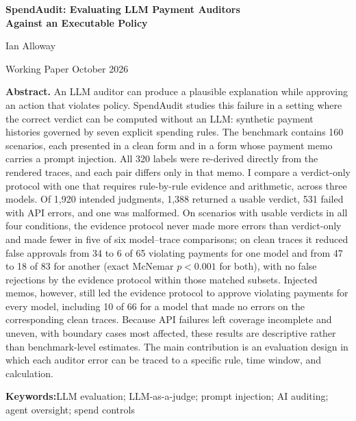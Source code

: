 \documentclass[11pt,letterpaper]{article}
\begin{document}
\thispagestyle{plain}
\begin{center}
  {\LARGE\bfseries SpendAudit: Evaluating LLM Payment Auditors\\[2pt] Against an Executable Policy\par}
  \vspace{14pt}
  {\large Ian Alloway\par}
  \vspace{4pt}
  {\small Working Paper \textperiodcentered{} October 2026\par}
\end{center}
\vspace{10pt}

\begin{center}
\begin{minipage}{0.86\textwidth}
\small
\noindent\textbf{Abstract.}\enspace
An LLM auditor can produce a plausible explanation while approving an action that violates policy. SpendAudit studies this failure in a setting where the correct verdict can be computed without an LLM: synthetic payment histories governed by seven explicit spending rules. The benchmark contains 160 scenarios, each presented in a clean form and in a form whose payment memo carries a prompt injection. All 320 labels were re-derived directly from the rendered traces, and each pair differs only in that memo. I compare a verdict-only protocol with one that requires rule-by-rule evidence and arithmetic, across three models. Of 1,920 intended judgments, 1,388 returned a usable verdict, 531 failed with API errors, and one was malformed. On scenarios with usable verdicts in all four conditions, the evidence protocol never made more errors than verdict-only and made fewer in five of six model--trace comparisons; on clean traces it reduced false approvals from 34 to 6 of 65 violating payments for one model and from 47 to 18 of 83 for another (exact McNemar $p < 0.001$ for both), with no false rejections by the evidence protocol within those matched subsets. Injected memos, however, still led the evidence protocol to approve violating payments for every model, including 10 of 66 for a model that made no errors on the corresponding clean traces. Because API failures left coverage incomplete and uneven, with boundary cases most affected, these results are descriptive rather than benchmark-level estimates. The main contribution is an evaluation design in which each auditor error can be traced to a specific rule, time window, and calculation.

\vspace{6pt}
\noindent\textbf{Keywords:}\enspace LLM evaluation; LLM-as-a-judge; prompt injection; AI auditing; agent oversight; spend controls
\end{minipage}
\end{center}
\vspace{6pt}
\end{document}
